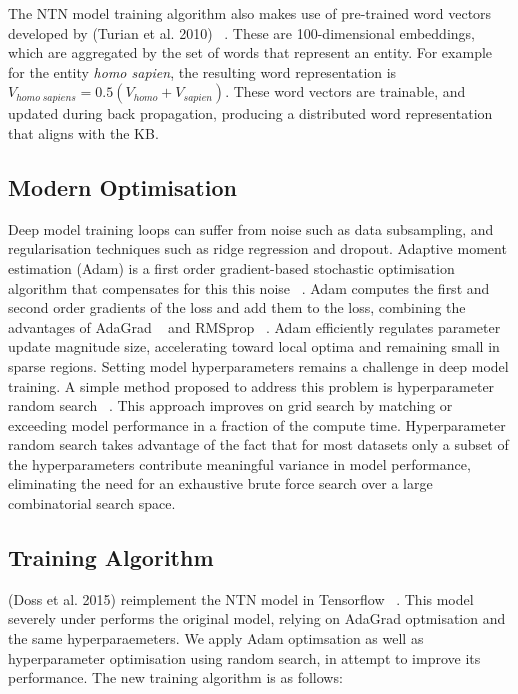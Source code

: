 The NTN model training algorithm also makes use of pre-trained word vectors developed by (Turian et al. 2010) ~\citep{turian2010word}. These are 100-dimensional embeddings, which are aggregated by the set of words that represent an entity. For example for the entity \textit{homo sapien}, the resulting word representation is $V_{homo \; sapiens} = 0.5(V_{homo} + V_{sapien})$. These word vectors are trainable, and updated during back propagation, producing a distributed word representation that aligns with the KB.

\subsection{Modern Optimisation}

Deep model training loops can suffer from noise such as data subsampling, and regularisation techniques such as ridge regression and dropout. Adaptive moment estimation (Adam) is a first order gradient-based stochastic optimisation algorithm that compensates for this this noise ~\citep{kingma2014adam}. Adam computes the first and second order gradients of the loss and add them to the loss, combining the advantages of AdaGrad ~\citep{duchi2011adaptive} and RMSprop ~\citep{tieleman2012lecture}. Adam efficiently regulates parameter update magnitude size, accelerating toward local optima and remaining small in sparse regions. \newpage
Setting model hyperparameters remains a challenge in deep model training. A simple method proposed to address this problem is hyperparameter random search ~\citep{bergstra2012random}. This approach improves on grid search by matching or exceeding model performance in a fraction of the compute time. Hyperparameter random search takes advantage of the fact that for most datasets only a subset of the hyperparameters contribute meaningful variance in model performance, eliminating the need for an exhaustive brute force search over a large combinatorial search space.

\subsection{Training Algorithm}

(Doss et al. 2015) reimplement the NTN model in Tensorflow ~\citep{abadi2016tensorflow}. This model severely under performs the original model, relying on AdaGrad optmisation and the same hyperparaemeters. We apply Adam optimsation as well as hyperparameter optimisation using random search, in attempt to improve its performance. The new training algorithm is as follows: \bigbreak

